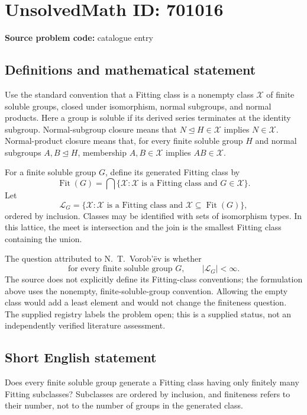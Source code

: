 \documentclass[11pt]{article}
\begin{document}
\section*{UnsolvedMath ID: 701016}
\textbf{Source problem code:} catalogue entry
\subsection{Definitions and mathematical statement}
Use the standard convention that a Fitting class is a nonempty class \(\mathcal X\) of finite soluble groups, closed under isomorphism, normal subgroups, and normal products. Here a group is soluble if its derived series terminates at the identity subgroup. Normal-subgroup closure means that \(N\trianglelefteq H\in\mathcal X\) implies \(N\in\mathcal X\). Normal-product closure means that, for every finite soluble group \(H\) and normal subgroups \(A,B\trianglelefteq H\), membership \(A,B\in\mathcal X\) implies \(AB\in\mathcal X\).

For a finite soluble group \(G\), define its generated Fitting class by
\[
\operatorname{Fit}(G)=\bigcap\{\mathcal X:\mathcal X\text{ is a Fitting class and }G\in\mathcal X\}.
\]
Let
\[
\mathcal L_G=\{\mathcal X:\mathcal X\text{ is a Fitting class and }\mathcal X\subseteq\operatorname{Fit}(G)\},
\]
ordered by inclusion. Classes may be identified with sets of isomorphism types. In this lattice, the meet is intersection and the join is the smallest Fitting class containing the union.

The question attributed to N.\ T.\ Vorob'\"ev is whether
\[
\text{for every finite soluble group }G,\qquad |\mathcal L_G|<\infty.
\]
The source does not explicitly define its Fitting-class conventions; the formulation above uses the nonempty, finite-soluble-group convention. Allowing the empty class would add a least element and would not change the finiteness question. The supplied registry labels the problem open; this is a supplied status, not an independently verified literature assessment.
\subsection{Short English statement}
Does every finite soluble group generate a Fitting class having only finitely many Fitting subclasses? Subclasses are ordered by inclusion, and finiteness refers to their number, not to the number of groups in the generated class.
\end{document}
